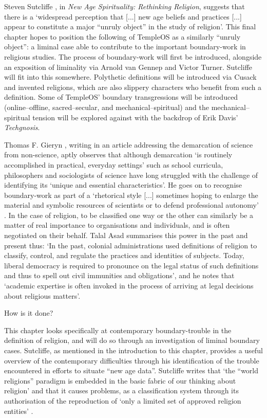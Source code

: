 \documentclass{article}
\begin{document}
Steven Sutcliffe \parencite*{Sutcliffe14},
in \textit{New Age Spirituality: Rethinking Religion},
suggests that there is a `widespread perception that [...]
new age beliefs and practices [...] appear to constitute
a major ``unruly object'' in the study of religion'.
This final chapter hopes to position the following of TempleOS as a
similarly ``unruly object'': a liminal case able to contribute to the
important boundary-work in religious studies.
The process of boundary-work will first be introduced,
alongside an exposition of liminality via Arnold van Gennep and Victor Turner.
Sutcliffe will fit into this somewhere.
Polythetic definitions will be introduced via Cusack and invented religions,
which are also slippery characters who benefit from such a definition.
Some of TempleOS' boundary transgressions will be introduced
(online--offline, sacred--secular, and mechanical--spiritual)
and the mechanical--spiritual tension will be explored
against with the backdrop of Erik Davis' \textit{Techgnosis}.

Thomas F. Gieryn \parencite*[781]{Gieryn83}, writing in an article
addressing the demarcation of science from non-science, aptly observes
that although demarcation `is routinely accomplished in practical,
everyday settings' such as school curricula,
philosophers and sociologists of science have long struggled
with the challenge of identifying its `unique and essential characteristics'.
He goes on to recognise boundary-work as part of a `rhetorical style [...]
sometimes hoping to enlarge the material and symbolic resources of scientists
or to defend professional autonomy' \parencite[782]{Gieryn83}.
In the case of religion, to be classified one way or the other can similarly
be a matter of real importance to organisations and individuals,
and is often negotiated on their behalf.
Talal Asad \parencite*[39]{Asad11} summarises this power
in the past and present thus:
`In the past, colonial  administrations  used definitions of religion
to classify, control, and regulate the practices and identities of subjects.
Today, liberal democracy  is required to pronounce on the legal status
of such definitions and thus to spell out civil immunities and obligations',
and he notes that `academic expertise is often invoked
in the process of arriving at legal decisions about religious matters'.

How is it done?

This chapter looks specifically at contemporary boundary-trouble
in the definition of religion, and will do so through an investigation
of liminal boundary cases.
Sutcliffe, as mentioned in the introduction to this chapter,
provides a useful overview of the contemporary difficulties through his
identification of the trouble encountered in efforts to situate
``new age data''.
Sutcliffe writes that `the ``world religions'' paradigm is embedded in the
basic fabric of our thinking about religion' and that it causes problems,
as a classification system through its authorisation of the reproduction of
`only a limited set of approved religion entities'
\parencite[22]{Sutcliffe14}.

\printbibliography
\end{document}
